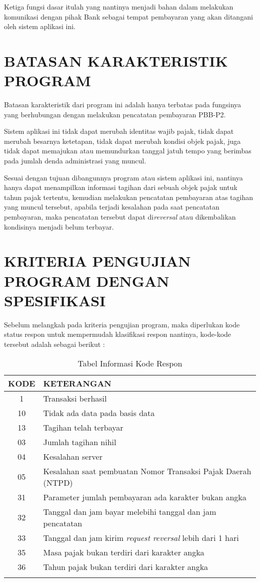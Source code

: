 \documentclass[pdftex,12pt, oneside]{article}
\begin{document}
Ketiga fungsi dasar itulah yang nantinya menjadi bahan dalam melakukan komunikasi dengan pihak Bank sebagai tempat pembayaran yang akan ditangani oleh sistem aplikasi ini.

\section{BATASAN KARAKTERISTIK PROGRAM}

Batasan karakteristik dari program ini adalah hanya terbatas pada fungsinya yang berhubungan dengan melakukan pencatatan pembayaran PBB-P2.

Sistem aplikasi ini tidak dapat merubah identitas wajib pajak, tidak dapat merubah besarnya ketetapan, tidak dapat merubah kondisi objek pajak, juga tidak dapat memajukan atau memundurkan tanggal jatuh tempo yang berimbas pada jumlah denda administrasi yang muncul.

Sesuai dengan tujuan dibangunnya program atau sistem aplikasi ini, nantinya hanya dapat menampilkan informasi tagihan dari sebuah objek pajak untuk tahun pajak tertentu, kemudian melakukan pencatatan pembayaran atas tagihan yang muncul tersebut, apabila terjadi kesalahan pada saat pencatatan pembayaran, maka pencatatan tersebut dapat di\textit{reversal} atau dikembalikan kondisinya menjadi belum terbayar.

\section{KRITERIA PENGUJIAN PROGRAM DENGAN SPESIFIKASI}

Sebelum melangkah pada kriteria pengujian program, maka diperlukan kode status respon untuk mempermudah klasifikasi respon nantinya, kode-kode tersebut adalah sebagai berikut :

  \begin{longtable}{|c|l|}
    \hline
    KODE & KETERANGAN \\
    \hline
    \hline
    1 & Transaksi berhasil \\
    \hline
    10 & Tidak ada data pada basis data \\
    \hline
    13 & Tagihan telah terbayar \\
    \hline
    03 & Jumlah tagihan nihil \\
    \hline
    04 & Kesalahan server \\
    \hline
    05 & Kesalahan saat pembuatan Nomor Transaksi Pajak Daerah (NTPD) \\
    \hline
    31 & Parameter jumlah pembayaran ada karakter bukan angka \\
    \hline
    32 & Tanggal dan jam bayar melebihi tanggal dan jam pencatatan \\
    \hline
    33 & Tanggal dan jam kirim \textit{request reversal} lebih dari 1 hari \\
    \hline
    35 & Masa pajak bukan terdiri dari karakter angka \\
    \hline
    36 & Tahun pajak bukan terdiri dari karakter angka \\
    \hline
    \caption{Tabel Informasi Kode Respon}
  \end{longtable}
\end{document}
